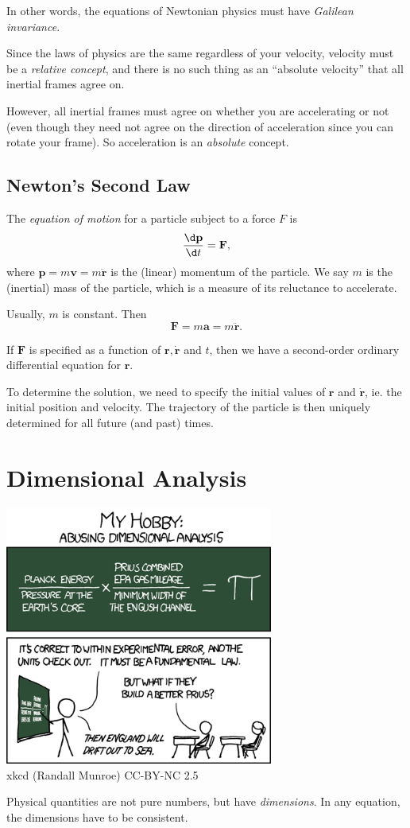 \documentclass[a4paper]{article}
\begin{document}
In other words, the equations of Newtonian physics must have \emph{Galilean invariance}.

Since the laws of physics are the same regardless of your velocity, velocity must be a \emph{relative concept}, and there is no such thing as an ``absolute velocity'' that all inertial frames agree on.

However, all inertial frames must agree on whether you are accelerating or not (even though they need not agree on the direction of acceleration since you can rotate your frame). So acceleration is an \emph{absolute} concept.

\subsection{Newton's Second Law}
\begin{law}
  The \emph{equation of motion} for a particle subject to a force $F$ is
  \[
    \frac{\d \mathbf{p}}{\d t} = \mathbf{F},
  \]
  where $\mathbf{p} = m\mathbf{v} = m\ddot{\mathbf{r}}$ is the (linear) momentum of the particle. We say $m$ is the (inertial) mass of the particle, which is a measure of its reluctance to accelerate.
\end{law}

Usually, $m$ is constant. Then
\[
  \mathbf{F} = m\mathbf{a} = m\ddot{\mathbf{r}}.
\]


If $\mathbf{F}$ is specified as a function of $\mathbf{r}, \dot{\mathbf{r}}$ and $t$, then we have a second-order ordinary differential equation for $\mathbf{r}$.

To determine the solution, we need to specify the initial values of $\mathbf{r}$ and $\dot{\mathbf{r}}$, ie. the initial position and velocity. The trajectory of the particle is then uniquely determined for all future (and past) times.

\section{Dimensional Analysis}
\begin{center}
  \includegraphics[width=250pt]{images/xkcd_dimensional_analysis.png}\\
  xkcd (Randall Munroe) CC-BY-NC 2.5
\end{center}
Physical quantities are not pure numbers, but have \emph{dimensions}. In any equation, the dimensions have to be consistent.
\end{document}
